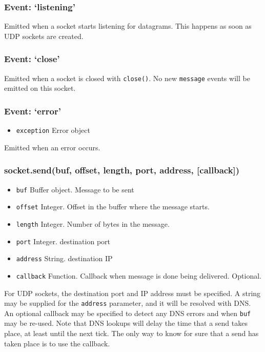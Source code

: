 \subsubsection{Event: `listening'}

Emitted when a socket starts listening for datagrams. This happens as
soon as UDP sockets are created.

\subsubsection{Event: `close'}

Emitted when a socket is closed with \texttt{close()}. No new
\texttt{message} events will be emitted on this socket.

\subsubsection{Event: `error'}

\begin{itemize}
\item
  \texttt{exception} Error object
\end{itemize}

Emitted when an error occurs.

\subsubsection{socket.send(buf, offset, length, port, address,
{[}callback{]})}

\begin{itemize}
\item
  \texttt{buf} Buffer object. Message to be sent
\item
  \texttt{offset} Integer. Offset in the buffer where the message
  starts.
\item
  \texttt{length} Integer. Number of bytes in the message.
\item
  \texttt{port} Integer. destination port
\item
  \texttt{address} String. destination IP
\item
  \texttt{callback} Function. Callback when message is done being
  delivered. Optional.
\end{itemize}

For UDP sockets, the destination port and IP address must be specified.
A string may be supplied for the \texttt{address} parameter, and it will
be resolved with DNS. An optional callback may be specified to detect
any DNS errors and when \texttt{buf} may be re-used. Note that DNS
lookups will delay the time that a send takes place, at least until the
next tick. The only way to know for sure that a send has taken place is
to use the callback.

